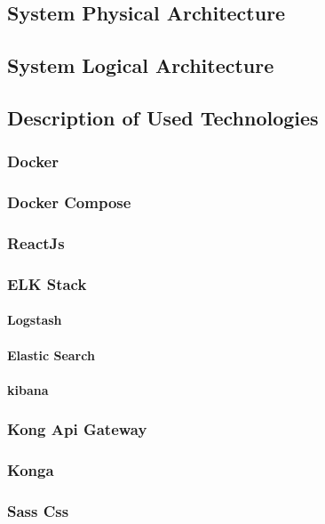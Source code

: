 \subsection{System Physical Architecture}
  
\subsection{System Logical Architecture}
  
\subsection{Description of Used Technologies}

\subsubsection{Docker}
\subsubsection{Docker Compose}
\subsubsection{ReactJs}
\subsubsection{ELK Stack}
\paragraph{Logstash}
\paragraph{Elastic Search}
\paragraph{kibana}
\subsubsection{Kong Api Gateway}
\subsubsection{Konga}
\subsubsection{Sass Css}
